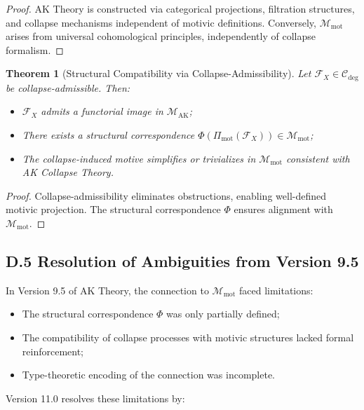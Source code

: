 \documentclass[11pt]{article}
\newtheorem{theorem}{Theorem}[section]
\begin{document}
\begin{proof}
AK Theory is constructed via categorical projections, filtration structures, and collapse mechanisms independent of motivic definitions. Conversely, $\mathcal{M}_{\mathrm{mot}}$ arises from universal cohomological principles, independently of collapse formalism.
\end{proof}

\begin{theorem}[Structural Compatibility via Collapse-Admissibility]
Let $\mathcal{F}_X \in \mathcal{C}_{\mathrm{deg}}$ be collapse-admissible. Then:

\begin{itemize}
    \item $\mathcal{F}_X$ admits a functorial image in $\mathcal{M}_{\mathrm{AK}}$;
    \item There exists a structural correspondence $\Phi(\Pi_{\mathrm{mot}}(\mathcal{F}_X)) \in \mathcal{M}_{\mathrm{mot}}$;
    \item The collapse-induced motive simplifies or trivializes in $\mathcal{M}_{\mathrm{mot}}$ consistent with AK Collapse Theory.
\end{itemize}
\end{theorem}

\begin{proof}
Collapse-admissibility eliminates obstructions, enabling well-defined motivic projection. The structural correspondence $\Phi$ ensures alignment with $\mathcal{M}_{\mathrm{mot}}$.
\end{proof}

\subsection*{D.5 Resolution of Ambiguities from Version 9.5}

In Version 9.5 of AK Theory, the connection to $\mathcal{M}_{\mathrm{mot}}$ faced limitations:

\begin{itemize}
    \item The structural correspondence $\Phi$ was only partially defined;
    \item The compatibility of collapse processes with motivic structures lacked formal reinforcement;
    \item Type-theoretic encoding of the connection was incomplete.
\end{itemize}

Version 11.0 resolves these limitations by:
\end{document}
